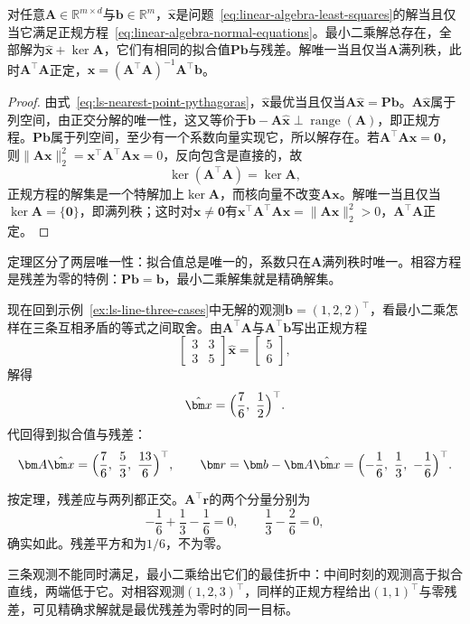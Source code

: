 \begin{theorem}[最小二乘解的刻画]
\label{thm:ls-least-squares-solutions}
对任意$\bm A\in\mathbb R^{m\times d}$与$\bm b\in\mathbb R^m$，$\hat{\bm x}$是问题~\eqref{eq:linear-algebra-least-squares}的解当且仅当它满足正规方程~\eqref{eq:linear-algebra-normal-equations}。最小二乘解总存在，全部解为$\hat{\bm x}+\ker\bm A$，它们有相同的拟合值$\bm P\bm b$与残差。解唯一当且仅当$\bm A$满列秩，此时$\bm A^\top\bm A$正定，$\hat{\bm x}=(\bm A^\top\bm A)^{-1}\bm A^\top\bm b$。
\end{theorem}
\begin{proof}
由式~\eqref{eq:ls-nearest-point-pythagoras}，$\hat{\bm x}$最优当且仅当$\bm A\hat{\bm x}=\bm P\bm b$。$\bm A\hat{\bm x}$属于列空间，由正交分解的唯一性，这又等价于$\bm b-\bm A\hat{\bm x}\perp\operatorname{range}(\bm A)$，即正规方程。$\bm P\bm b$属于列空间，至少有一个系数向量实现它，所以解存在。若$\bm A^\top\bm A\bm x=\bm0$，则$\lVert\bm A\bm x\rVert_2^2=\bm x^\top\bm A^\top\bm A\bm x=0$，反向包含是直接的，故
\begin{equation}
 \ker(\bm A^\top\bm A)=\ker\bm A ,
 \label{eq:ls-normal-kernel}
\end{equation}
正规方程的解集是一个特解加上$\ker\bm A$，而核向量不改变$\bm A\bm x$。解唯一当且仅当$\ker\bm A=\{\bm0\}$，即满列秩；这时对$\bm x\neq\bm0$有$\bm x^\top\bm A^\top\bm A\bm x=\lVert\bm A\bm x\rVert_2^2>0$，$\bm A^\top\bm A$正定。
\end{proof}

定理区分了两层唯一性：拟合值总是唯一的，系数只在$\bm A$满列秩时唯一。相容方程是残差为零的特例：$\bm P\bm b=\bm b$，最小二乘解集就是精确解集。

\begin{example}[三条不相容观测的最佳折中]
\label{ex:ls-line-least-squares}
现在回到示例~\ref{ex:ls-line-three-cases}中无解的观测$\bm b=(1,2,2)^\top$，看最小二乘怎样在三条互相矛盾的等式之间取舍。由$\bm A^\top\bm A$与$\bm A^\top\bm b$写出正规方程
\[
 \begin{bmatrix}3&3\\3&5\end{bmatrix}\hat{\bm x}=\begin{bmatrix}5\\6\end{bmatrix},
\]
解得
\[
 \hat{\bm x}=\Bigl(\frac76,\ \frac12\Bigr)^\top .
\]
代回得到拟合值与残差：
\[
 \bm A\hat{\bm x}=\Bigl(\frac76,\ \frac53,\ \frac{13}6\Bigr)^\top,\qquad
 \bm r=\bm b-\bm A\hat{\bm x}=\Bigl(-\frac16,\ \frac13,\ -\frac16\Bigr)^\top .
\]

按定理，残差应与两列都正交。$\bm A^\top\bm r$的两个分量分别为
\[
 -\frac16+\frac13-\frac16=0,\qquad \frac13-\frac26=0,
\]
确实如此。残差平方和为$1/6$，不为零。

三条观测不能同时满足，最小二乘给出它们的最佳折中：中间时刻的观测高于拟合直线，两端低于它。对相容观测$(1,2,3)^\top$，同样的正规方程给出$(1,1)^\top$与零残差，可见精确求解就是最优残差为零时的同一目标。
\end{example}

